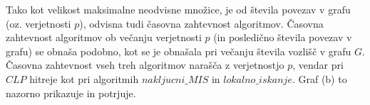 \documentclass[a4paper, 12pt]{article}
\begin{document}

\noindent Tako kot velikost maksimalne neodvisne množice, je od števila povezav v grafu (oz. verjetnosti $p$), odvisna tudi časovna zahtevnost algoritmov. Časovna zahtevnost algoritmov ob večanju verjetnosti $p$ 
(in posledično števila povezav v grafu) se obnaša podobno, kot se je obnašala pri večanju števila vozlišč v grafu $G$. Časovna zahtevnost vseh treh algoritmov narašča z verjetnostjo $p$, vendar pri $CLP$ hitreje kot pri algoritmih
$nakljucni\_MIS$ in $lokalno\_iskanje$. Graf (b) to nazorno prikazuje in potrjuje.

\end{document}
